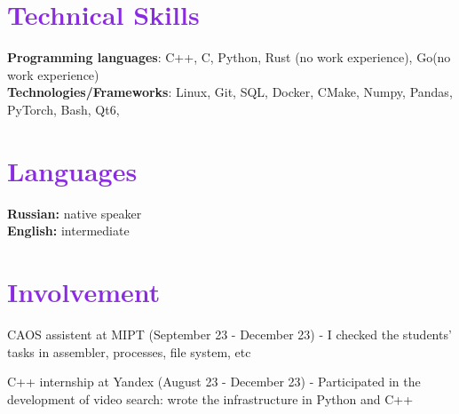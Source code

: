 \documentclass[letterpaper,11pt]{article}
\begin{document}
%
\section{\textcolor{BlueViolet}{Technical Skills}}
 \begin{itemize}[leftmargin=0.15in, label={}]
    \small{\item{
        \textbf{Programming languages}{: C++, C, Python, Rust (no work experience), Go(no work experience)} \\
     \textbf{Technologies/Frameworks}{: Linux, Git, SQL, Docker, CMake, Numpy, Pandas, PyTorch, Bash, Qt6, } \\
    }}
 \end{itemize}
 \vspace{-16pt}


\section{\textcolor{BlueViolet}{Languages}}
 \begin{itemize}[leftmargin=0.15in, label={}]
    \small{\item{
        \textbf{Russian:}{ native speaker} \\
        \textbf{English:}{ intermediate} \\
    }}
 \end{itemize}
 \vspace{-16pt}

\section{\textcolor{BlueViolet}{Involvement}}
 \begin{itemize}[leftmargin=0.15in]
    {\item{
        { CAOS assistent at MIPT (September 23 - December 23) - I checked the students' tasks in assembler, processes, file system, etc} \\
    }}
    {\item{
        { C++ internship at Yandex (August 23 - December 23) - Participated in the development of video search: wrote the infrastructure in Python and C++}
    }}
 \end{itemize}
 \vspace{-16pt}

\end{document}
